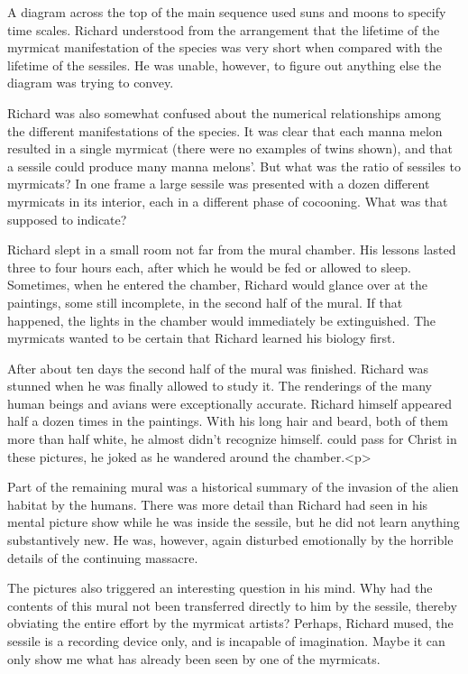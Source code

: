 \documentclass[]{article}
\begin{document}
{{A diagram across the top of the main sequence used suns and moons to specify time scales. Richard understood from the arrangement that the lifetime of the myrmicat manifestation of the species was very short when compared with the lifetime of the sessiles. He was unable, however, to figure out anything else the diagram was trying to convey.

Richard was also somewhat confused about the numerical relationships among the different manifestations of the species. It was clear that each manna melon resulted in a single myrmicat (there were no examples of twins shown), and that a sessile could produce many manna melons’. But what was the ratio of sessiles to myrmicats? In one frame a large sessile was presented with a dozen different myrmicats in its interior, each in a different phase of cocooning. What was that supposed to indicate?

Richard slept in a small room not far from the mural chamber. His lessons lasted three to four hours each, after which he would be fed or allowed to sleep. Sometimes, when he entered the chamber, Richard would glance over at the paintings, some still incomplete, in the second half of the mural. If that happened, the lights in the chamber would immediately be extinguished. The myrmicats wanted to be certain that Richard learned his biology first.

After about ten days the second half of the mural was finished. Richard was stunned when he was finally allowed to study it. The renderings of the many human beings and avians were exceptionally accurate. Richard himself appeared half a dozen times in the paintings. With his long hair and beard, both of them more than half white, he almost didn’t recognize himself. could pass for Christ in these pictures, he joked as he wandered around the chamber.<p>

Part of the remaining mural was a historical summary of the invasion of the alien habitat by the humans. There was more detail than Richard had seen in his mental picture show while he was inside the sessile, but he did not learn anything substantively new. He was, however, again disturbed emotionally by the horrible details of the continuing massacre.

The pictures also triggered an interesting question in his mind. Why had the contents of this mural not been transferred directly to him by the sessile, thereby obviating the entire effort by the myrmicat artists? Perhaps, Richard mused, the sessile is a recording device only, and is incapable of imagination. Maybe it can only show me what has already been seen by one of the myrmicats.

}}
\end{document}
